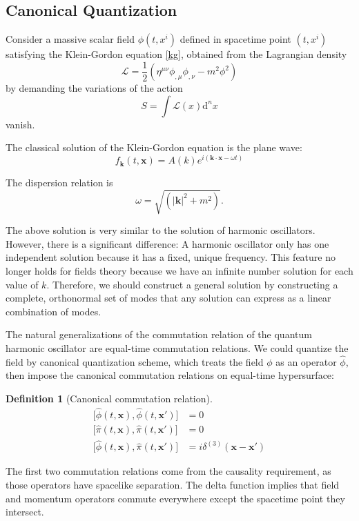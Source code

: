 \documentclass[12pt]{article}
\numberwithin{equation}{section}
\theoremstyle{1style}
\newtheorem{definition}[equation]{Definition}
\begin{document}
\subsection{Canonical Quantization}
Consider a massive scalar field \(\phi(t,x^{i})\) defined in spacetime point \((t,x^{i})\) satisfying the Klein-Gordon equation \ref{kg},
obtained from the Lagrangian density
\[\mathcal{L} = \frac{1}{2}(\eta^{\mu\nu} \phi_{,\mu} \phi_{,\nu}- m^2 \phi^2)\]
by demanding the variations of the action \[S = \int \mathcal{L}(x) \mathrm{d}^{n}x\] vanish.
\par
The classical solution of the Klein-Gordon equation is the plane wave:
\[f_{\mathbf{k}}(t,\mathbf{x})=  A(k)e^{i(\mathbf{k}\cdot \mathbf{x}-\omega t)}\]

The dispersion relation is \[\omega = \sqrt{(\mathbf{|k|}^2 + m^2 )}.\]

The above solution is very similar to the solution of harmonic oscillators. However, there is a significant difference:
A harmonic oscillator only has one independent solution because it has a fixed, unique frequency.
This feature no longer holds for fields theory because we have an infinite number solution for each value of \(k\).
Therefore, we should construct a general solution by constructing a complete, orthonormal set of modes that any solution
can express as a linear combination of modes.




The natural generalizations of the commutation relation of the quantum harmonic oscillator are equal-time commutation relations.
We could quantize the field by canonical quantization scheme, which treats the field \(\phi\) as an operator \(\hat{\phi}\),
then impose the canonical commutation relations on equal-time hypersurface:
\begin{definition}[Canonical commutation relation]\label{121}
  \begin{align*}
    \bigl[\hat{\phi}(t,\mathbf{x}),\hat{\phi}(t,\mathbf{x'})\bigr] & =0                                     \\
    \bigl[\hat{\pi}(t,\mathbf{x}),\hat{\pi}(t,\mathbf{x'})\bigr]   & =0                                     \\
    \bigl[\hat{\phi}(t,\mathbf{x}),\hat{\pi}(t,\mathbf{x'})\bigr]  & =i\delta^{(3)}(\mathbf{x}-\mathbf{x'})
  \end{align*}
\end{definition}
The first two commutation relations come from the causality requirement, as those operators have spacelike separation.
The delta function implies that field and momentum operators commute everywhere except the spacetime point they intersect.
\end{document}
